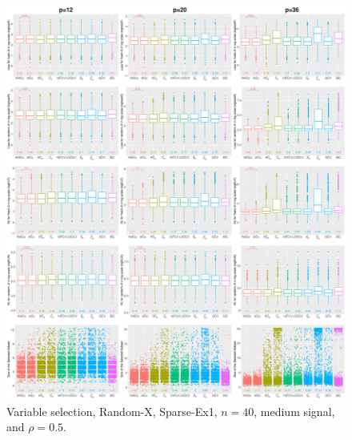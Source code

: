 \begin{figure}[!ht]
\centering
\includegraphics[width=\textwidth]{figures/supplement/randomx/subset_selection/Sparse-Ex1_n40_msnr_rho05.eps}
\caption{Variable selection, Random-X, Sparse-Ex1, $n=40$, medium signal, and $\rho=0.5$.}
\end{figure}
\clearpage
